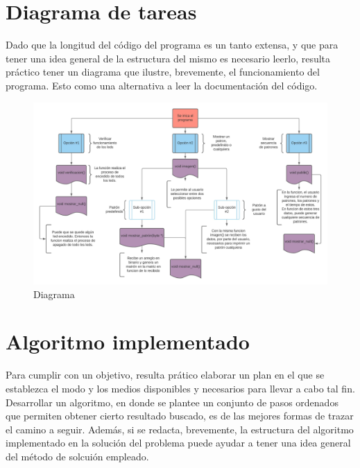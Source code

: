 \documentclass{article}
\begin{document}
\section{Diagrama de tareas}
Dado que la longitud del código del programa es un tanto extensa, y que para tener una idea general de la estructura del mismo es necesario leerlo, resulta práctico tener un diagrama que ilustre, brevemente, el funcionamiento del programa. Esto como una alternativa a leer la documentación del código.

\begin{figure}[h!]
\includegraphics[width=13cm]{Diagrama de tareas.jpeg}
\centering
\caption{Diagrama}
\label{fig:Diagrama}
\end{figure}

\section{Algoritmo implementado}
Para cumplir con un objetivo, resulta prático elaborar un plan en el que se establezca el modo y los medios disponibles y necesarios para llevar a cabo tal fin. Desarrollar un algoritmo, en donde se plantee un conjunto de pasos ordenados que permiten obtener cierto resultado buscado, es de las mejores formas de trazar el camino a seguir. Además, si se redacta, brevemente, la estructura del algoritmo implementado en la solución del problema puede ayudar a tener una idea general del método de solcuión empleado. 
\end{document}
